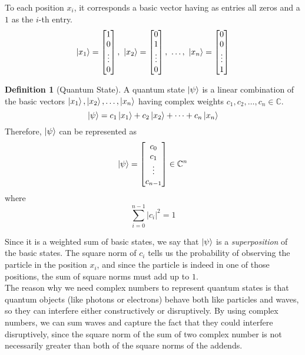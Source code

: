 \documentclass[12pt,a4paper]{report}
\theoremstyle{definition}
\newtheorem{definition}{Definition}[section]
\theoremstyle{definition}
\theoremstyle{definition}
\begin{document}
To each position $x_i$, it corresponds a basic vector having as entries all zeros and a $1$ as the $i$-th entry.
\begin{equation*}
    \ket{x_1} = \begin{bmatrix}
        1\\
        0\\
        \vdots\\
        0\\
    \end{bmatrix},\ 
    \ket{x_2} = \begin{bmatrix}
        0\\
        1\\
        \vdots\\
        0\\
    \end{bmatrix},\ \ldots,\ 
    \ket{x_n} = \begin{bmatrix}
        0\\
        0\\
        \vdots\\
        1\\
    \end{bmatrix}
\end{equation*}

\begin{definition}[Quantum State]
A quantum state $\ket{\psi}$ is a linear combination of the basic vectors $\ket{x_1}, \ket{x_2}, \ldots, \ket{x_n}$ having complex weights $c_1, c_2, \ldots, c_n \in \mathbb{C}$.
\begin{equation*}
    \ket{\psi}=c_1\ket{x_1}+c_2\ket{x_2}+\cdots+c_n\ket{x_n}
\end{equation*}
Therefore, $\ket{\psi}$ can be represented as
\begin{equation*}
    \ket{\psi}=\begin{bmatrix}
        c_0\\
        c_1\\
        \vdots\\
        c_{n-1}\\
    \end{bmatrix}\in \mathbb{C}^n
\end{equation*}
where
\begin{equation*}
    \sum_{i=0}^{n-1} \left\lvert c_i \right\rvert ^2 = 1
\end{equation*}
\end{definition}
Since it is a weighted sum of basic states, we say that $\ket{\psi}$ is a \textit{superposition} of the basic states.
The square norm of $c_i$ tells us the probability of observing the particle in the position $x_i$, and since the particle is indeed in one of those positions, the sum of square norms must add up to $1$.\\
The reason why we need complex numbers to represent quantum states is that quantum objects (like photons or electrons) behave both like particles and waves, so they can interfere either constructively or disruptively. By using complex numbers, we can sum waves and capture the fact that they could interfere disruptively, since the square norm of the sum of two complex number is not necessarily greater than both of the square norms of the addends.
\end{document}
